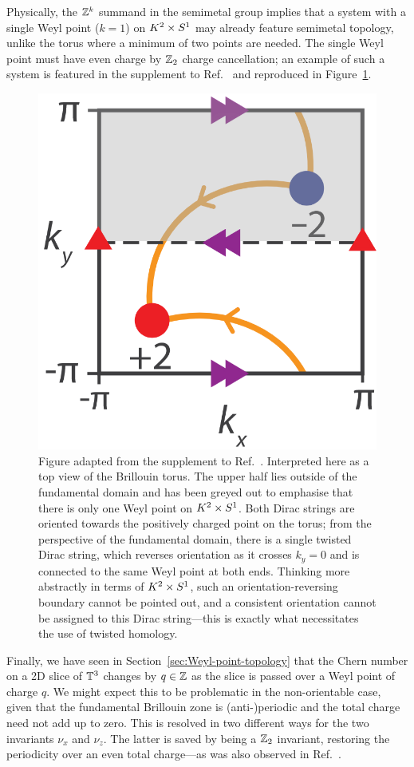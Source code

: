 Physically, the $\mathbb{Z}^k$ summand in the semimetal group implies that a system with a single Weyl point ($k=1$) on $K^2\times S^1$ may already feature semimetal topology, unlike the torus where a minimum of two points are needed. The single Weyl point must have even charge by $\mathbb{Z}_2$ charge cancellation; an example of such a system is featured in the supplement to Ref.~\cite{Fonseca-Vaidya_nonorientable} and reproduced in Figure~\ref{fig:double-points}.
\begin{figure}[htb!]
	\centering
	\includegraphics[width=.4\linewidth]{Images/double-points}
	\caption{Figure adapted from the supplement to Ref.~\cite{Fonseca-Vaidya_nonorientable}. Interpreted here as a top view of the Brillouin torus. The upper half lies outside of the fundamental domain and has been greyed out to emphasise that there is only one Weyl point on $K^2\times S^1$. Both Dirac strings are oriented towards the positively charged point on the torus; from the perspective of the fundamental domain, there is a single twisted Dirac string, which reverses orientation as it crosses $k_y=0$ and is connected to the same Weyl point at both ends. Thinking more abstractly in terms of $K^2\times S^1$, such an orientation-reversing boundary cannot be pointed out, and a consistent orientation cannot be assigned to this Dirac string---this is exactly what necessitates the use of twisted homology.}
	\label{fig:double-points}
\end{figure}

Finally, we have seen in Section~\ref{sec:Weyl-point-topology} that the Chern number on a 2D slice of $\mathbb{T}^3$ changes by $q\in\mathbb{Z}$ as the slice is passed over a Weyl point of charge $q$. We might expect this to be problematic in the non-orientable case, given that the fundamental Brillouin zone is (anti-)periodic and the total charge need not add up to zero. This is resolved in two different ways for the two invariants $\nu_x$ and $\nu_z$. The latter is saved by being a $\mathbb{Z}_2$ invariant, restoring the periodicity over an even total charge---as was also observed in Ref.~\cite{Fonseca-Vaidya_nonorientable}.


